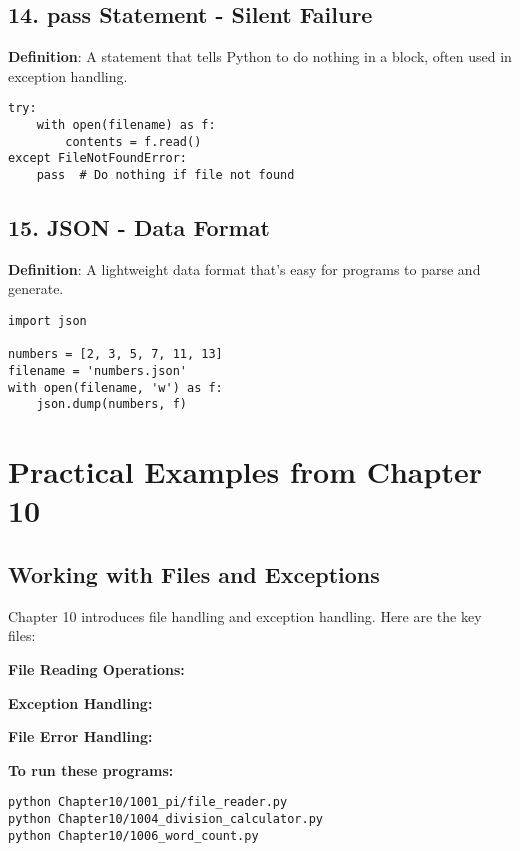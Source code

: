\subsection*{14. pass Statement - Silent Failure}
\textbf{Definition}: A statement that tells Python to do nothing in a block, often used in exception handling.

\begin{lstlisting}
try:
    with open(filename) as f:
        contents = f.read()
except FileNotFoundError:
    pass  # Do nothing if file not found
\end{lstlisting}

\subsection*{15. JSON - Data Format}
\textbf{Definition}: A lightweight data format that's easy for programs to parse and generate.

\begin{lstlisting}
import json

numbers = [2, 3, 5, 7, 11, 13]
filename = 'numbers.json'
with open(filename, 'w') as f:
    json.dump(numbers, f)
\end{lstlisting}

\section*{Practical Examples from Chapter 10}

\subsection*{Working with Files and Exceptions}
Chapter 10 introduces file handling and exception handling. Here are the key files:

\textbf{File Reading Operations:}


\textbf{Exception Handling:}


\textbf{File Error Handling:}


\textbf{To run these programs:}
\begin{verbatim}
python Chapter10/1001_pi/file_reader.py
python Chapter10/1004_division_calculator.py
python Chapter10/1006_word_count.py
\end{verbatim}

